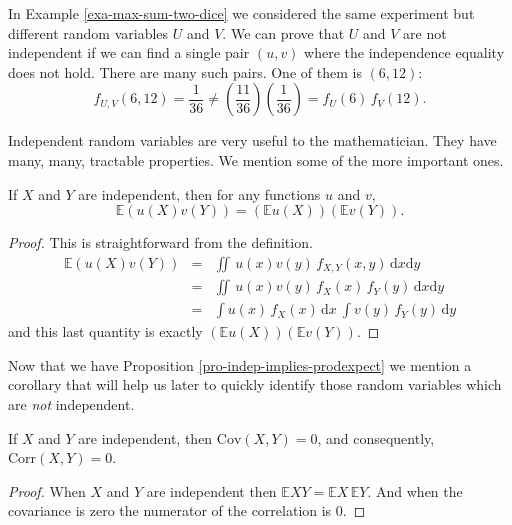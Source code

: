 \documentclass[captions=tableheading]{scrbook}
\begin{document}
\begin{example}
In Example \ref{exa-max-sum-two-dice} we considered the same experiment but different random variables \(U\) and \(V\). We can prove that \(U\) and \(V\) are not independent if we can find a single pair \((u,v)\) where the independence equality does not hold. There are many such pairs. One of them is \((6,12)\):
\[
f_{U,V}(6,12)=\frac{1}{36}\neq\left(\frac{11}{36}\right)\left(\frac{1}{36}\right)=f_{U}(6)\, f_{V}(12).
\]
\end{example}

Independent random variables are very useful to the mathematician. They have many, many, tractable properties. We mention some of the more important ones.

\begin{prop}
If \(X\) and \(Y\) are independent, then for any functions \(u\) and \(v\), 
\begin{equation}
\mathbb{E}\left(u(X)v(Y)\right)=\left(\mathbb{E} u(X)\right)\left(\mathbb{E} v(Y)\right).
\end{equation}
\end{prop}

\begin{proof}
This is straightforward from the definition.
\begin{eqnarray*}
\mathbb{E}\left(u(X)v(Y)\right) & = & \iint\, u(x)v(y)\, f_{X,Y}(x,y)\,\mathrm{d} x\mathrm{d} y\\
 & = & \iint\, u(x)v(y)\, f_{X}(x)\, f_{Y}(y)\,\mathrm{d} x\mathrm{d} y\\
 & = & \int u(x)\, f_{X}(x)\,\mathrm{d} x\ \int v(y)\, f_{Y}(y)\,\mathrm{d} y
\end{eqnarray*}
and this last quantity is exactly \(\left(\mathbb{E} u(X)\right)\left(\mathbb{E} v(Y)\right)\). 
\end{proof}

Now that we have Proposition \ref{pro-indep-implies-prodexpect} we mention a corollary that will help us later to quickly identify those random variables which are \emph{not} independent.

\begin{cor}
If \(X\) and \(Y\) are independent, then \(\mbox{Cov}(X,Y)=0\), and consequently,
\(\mbox{Corr}(X,Y)=0\).
\end{cor}

\begin{proof}
When \(X\) and \(Y\) are independent then \(\mathbb{E} XY=\mathbb{E} X\,\mathbb{E} Y\). And when the covariance is zero the numerator of the correlation is 0.
\end{proof}
\end{document}

